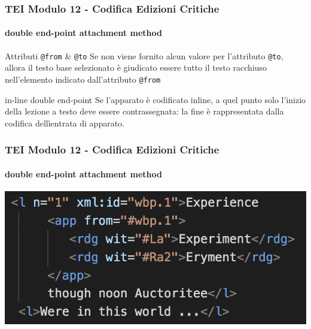 \begin{frame}
    \frametitle{TEI Modulo 12 - Codifica Edizioni Critiche}
    \framesubtitle{double end-point attachment method}
    \addtocounter{nframe}{1}
    


   

    \begin{block}{Attributi \texttt{@from} & \texttt{@to}}
      Se non viene fornito alcun valore per l'attributo \texttt{@to}, allora il testo base selezionato è giudicato essere tutto il testo racchiuso nell'elemento indicato dall'attributo \texttt{@from}
    \end{block}
    
    \begin{block}{in-line double end-point}
       Se l'apparato è codificato inline, a quel punto solo l'inizio della lezione a testo deve essere contrassegnata: la fine è rappresentata dalla codifica dellìentrata di apparato.
    \end{block}

\end{frame}

\begin{frame}
    \frametitle{TEI Modulo 12 - Codifica Edizioni Critiche}
    \framesubtitle{double end-point attachment method}
    \addtocounter{nframe}{1}
    
   
    \begin{center}
       \includegraphics[width=.95\textwidth]{imgs/inline-double-end-point.png}
    \end{center}

\end{frame}

